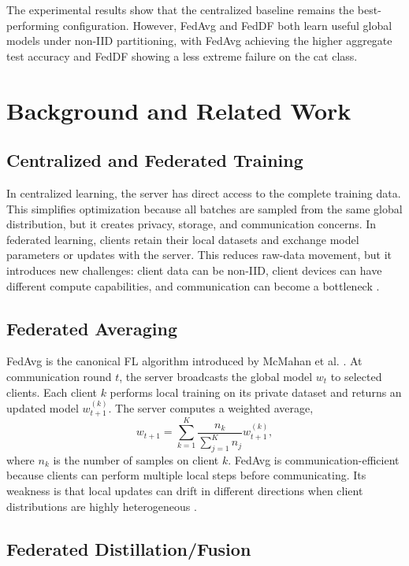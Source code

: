\documentclass[11pt]{article}
\begin{document}
The experimental results show that the centralized baseline remains the best-performing configuration. However, FedAvg and FedDF both learn useful global models under non-IID partitioning, with FedAvg achieving the higher aggregate test accuracy and FedDF showing a less extreme failure on the cat class.

\section{Background and Related Work}

\subsection{Centralized and Federated Training}

In centralized learning, the server has direct access to the complete training data. This simplifies optimization because all batches are sampled from the same global distribution, but it creates privacy, storage, and communication concerns. In federated learning, clients retain their local datasets and exchange model parameters or updates with the server. This reduces raw-data movement, but it introduces new challenges: client data can be non-IID, client devices can have different compute capabilities, and communication can become a bottleneck \cite{kairouz2021advances}.

\subsection{Federated Averaging}

FedAvg is the canonical FL algorithm introduced by McMahan et al. \cite{mcmahan2017communication}. At communication round $t$, the server broadcasts the global model $w_t$ to selected clients. Each client $k$ performs local training on its private dataset and returns an updated model $w_{t+1}^{(k)}$. The server computes a weighted average,
\begin{equation}
    w_{t+1}=\sum_{k=1}^{K}\frac{n_k}{\sum_{j=1}^{K}n_j}w_{t+1}^{(k)},
\end{equation}
where $n_k$ is the number of samples on client $k$. FedAvg is communication-efficient because clients can perform multiple local steps before communicating. Its weakness is that local updates can drift in different directions when client distributions are highly heterogeneous \cite{li2020federated,hsu2019measuring}.

\subsection{Federated Distillation/Fusion}
\end{document}
